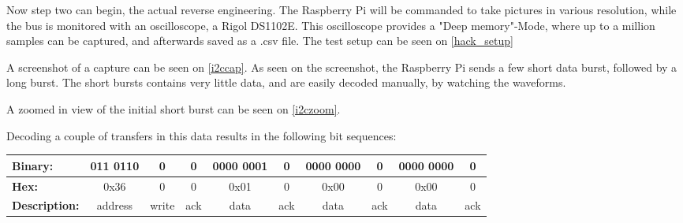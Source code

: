 
Now step two can begin, the actual reverse engineering. The Raspberry Pi will be commanded to take pictures in various resolution, while the \iic bus is monitored with an oscilloscope, a Rigol DS1102E. This oscilloscope provides a "Deep memory"-Mode, where up to a million samples can be captured, and afterwards saved as a .csv file. The test setup can be seen on \autoref{hack_setup}


A screenshot of a capture can be seen on \autoref{i2ccap}. As seen on the screenshot, the Raspberry Pi sends a few short data burst, followed by a long burst. The short bursts contains very little data, and are easily decoded manually, by watching the waveforms.

A zoomed in view of the initial short burst can be seen on \autoref{i2czoom}.


Decoding a couple of transfers in this data results in the following bit sequences:

\begin{tabular}{|l|c|c|c|c|c|c|c|c|c|}
\hline 
\textbf{Binary:} & 011 0110 & 0 & 0 & 0000 0001 & 0 & 0000 0000 & 0 & 0000 0000 & 0 \\ 
\hline 
\textbf{Hex:} & 0x36 & 0 & 0 & 0x01 & 0 & 0x00 & 0 & 0x00 & 0 \\ 
\hline 
\textbf{Description:} & address & write & ack & data & ack & data & ack & data & ack \\ 
\hline 
\end{tabular} 


